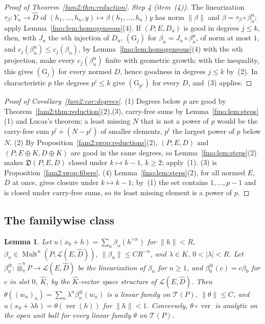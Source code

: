 \documentclass[11pt]{amsart}
\newtheorem{lemma}[theorem]{Lemma}
\theoremstyle{definition}
\theoremstyle{remark}
\numberwithin{equation}{section}
\newcommand{\cL}{\mathcal L}
\newcommand{\Mult}{\operatorname{Mult}}
\newcommand{\abs}[1]{\lvert #1\rvert}
\newcommand{\norm}[1]{\lVert #1\rVert}
\newcommand{\Kh}{\widehat K}
\theoremstyle{plain}
\theoremstyle{definition}
\theoremstyle{plain}
\newcommand{\hot}{\mathbin{\widehat\otimes}}
\newcommand{\fD}{\mathfrak D}
\begin{document}
\begin{proof}[Proof of Theorem~\ref{fam2:thm:reduction}]
\emph{Step 4 (item~(4)).} The linearization $\tau_\beta\colon Y_n\to\widehat D$ of $(h_1,\dots,h_n,y)\mapsto
\beta(h_1,\dots,h_n)y$ has norm $\norm\beta$ and $\beta=\tau_\beta\circ\beta^{\mathrm u}_n$; apply
Lemma~\ref{fmo:lem:homogeneous}(4). If $(P;E,D_{\mathrm u})$ is good in degrees $j\le k$, then, with $J_n$ the $n$th
injection of $D_{\mathrm u}$, $(\mathrm G_j)$ for $\beta_n=J_n\circ\beta^{\mathrm u}_n$, of norm at most $1$, and $c_j(\beta^{\mathrm u}_n)\le
c_j(\beta_n)$, by Lemma~\ref{fmo:lem:homogeneous}(4) with the $n$th projection, make every $c_j(\beta^{\mathrm u}_n)$ finite
with geometric growth; with the inequality, this gives $(\mathrm G_j)$ for every normed $D$, hence goodness in degrees
$j\le k$ by~(2). In characteristic $p$ the degrees $p^i\le k$ give $(\mathrm G_{p^i})$ for every $D$, and~(3) applies.
\end{proof}

\begin{proof}[Proof of Corollary~\ref{fam2:cor:degrees}]
(1) Degrees below $p$ are good by Theorem~\ref{fam2:thm:reduction}(2),(3), carry-free sums by Lemma~\ref{fmo:lem:steps}(1)
and Lucas's theorem; a least missing $N$ that is not a power of $p$ would be the carry-free sum $p^l+(N-p^l)$ of smaller
elements, $p^l$ the largest power of $p$ below $N$. (2) By Proposition~\ref{fam2:prop:reductions}(2), $(P;E,D)$ and
$(P;E\oplus K,D\oplus K)$ are good in the same degrees, so Lemma~\ref{fmo:lem:steps}(2) makes $\fD(P;E,D)$ closed under
$k\mapsto k-1$, $k\ge2$; apply~(1). (3) is Proposition~\ref{fam2:prop:fibers}. (4) Lemma~\ref{fmo:lem:steps}(2), for all
normed $E$, $D$ at once, gives closure under $k\mapsto k-1$; by~(1) the set contains $1,\dots,p-1$ and is closed under
carry-free sums, so its least missing element is a power of $p$.
\end{proof}

\subsection{The familywise class}\label{fmo:ssec:class}

\begin{lemma}\label{fmo:lem:germs}
Let $u(x_0+h)=\sum_n\beta_n(h^{\times n})$ for $\norm h<R$, $\beta_n\in\Mult^n(P;\cL(E,\widehat D))$,
$\norm{\beta_n}\le CR^{-n}$, and $\lambda\in K$, $0<\abs\lambda<R$. Let $\beta^\otimes_n\colon\hot^n_\pi P\to\cL(E,\widehat D)$
be the linearization of $\beta_n$ for $n\ge1$, and $\beta^\otimes_0(c)=c\beta_0$ for $c$ in slot $0$, $\Kh$, by the
$\Kh$-vector space structure of $\cL(E,\widehat D)$. Then $\theta((w_n)_n)=\sum_n\lambda^n\beta^\otimes_n(w_n)$ is a linear
family on $\mathcal T(P)$, $\norm\theta\le C$, and $u(x_0+\lambda h)=\theta(\operatorname{ver}(h))$ for $\norm h<1$.
Conversely, $\theta\circ\operatorname{ver}$ is analytic on the open unit ball for every linear family $\theta$ on
$\mathcal T(P)$.
\end{lemma}
\end{document}
